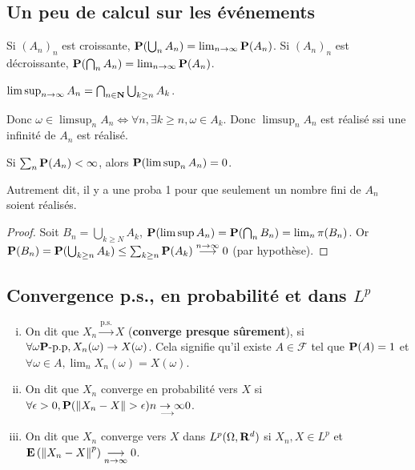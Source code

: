 \subsection{Un peu de calcul sur les événements}

	\begin{pop}
		Si $(A_n)_n$ est croissante, $\mathbf{P}(\bigcup_n A_n) = \lim_{n \to \infty} \mathbf{P}(A_n)$.
		Si $(A_n)_n$ est décroissante, $\mathbf{P}(\bigcap_n A_n) = \lim_{n \to \infty} \mathbf{P}(A_n)$.
	\end{pop}
	
	\begin{defn}
		$\limsup_{n \to \infty} A_n = \bigcap_{n \in \mathbf{N}} \bigcup_{k \geq n} A_k$.
	\end{defn}
	
	Donc $\omega \in \limsup_n A_n \iff \forall n, \exists k \geq n, \omega \in A_k$.
	Donc $\limsup_n A_n$ est réalisé ssi une infinité de $A_n$ est réalisé.
	
	\begin{lem}
		Si $\sum_n \mathbf{P}(A_n) < \infty$, alors $\mathbf{P}(\limsup_n A_n) = 0$.
	\end{lem}

	Autrement dit, il y a une proba 1 pour que seulement un nombre fini de $A_n$ soient réalisés.
	
	\begin{proof}
		Soit $B_n = \bigcup_{k \geq N} A_k$, $\mathbf{P}(\limsup A_n) = \mathbf{P}(\bigcap_n B_n) = \lim_n \pi(B_n)$.
		Or $\mathbf{P}(B_n) = \mathbf{P}(\bigcup_{k \geq n} A_k) \leq \sum_{k \geq n} \mathbf{P}(A_k) \overset{n \to \infty}{\longrightarrow} 0$ (par hypothèse).
	\end{proof}


\subsection{Convergence p.s., en probabilité et dans $L^p$}

	\begin{defn}
		\begin{enumerate}[(i)]
			\item On dit que $X_n \overset{\text{p.s.}}{\longrightarrow} X$ (\textbf{converge presque sûrement}), si $\forall \omega \mathbf{P}\text{-p.p}, X_n(\omega) \to X(\omega)$.
				Cela signifie qu'il existe $A \in \mathcal{F}$ tel que $\mathbf{P}(A) = 1$ et $\forall \omega \in A, \lim_n X_n(\omega) = X(\omega)$.
			\item On dit que $X_n$ converge en probabilité vers $X$ si $\forall \epsilon > 0, \mathbf{P}(\left\lVert X_n - X\right\rVert > \epsilon) \underset{\longrightarrow}{n \to \infty} 0$.
			\item On dit que $X_n$ converge vers $X$ dans $L^p(\Omega, \mathbf{R}^d)$ si $X_n, X \in L^p$ et $\mathbf{E} \left( \left\lVert X_n - X\right\rVert^p \right) \underset{n \to \infty}{\longrightarrow} 0$. 
		\end{enumerate}
	\end{defn}

